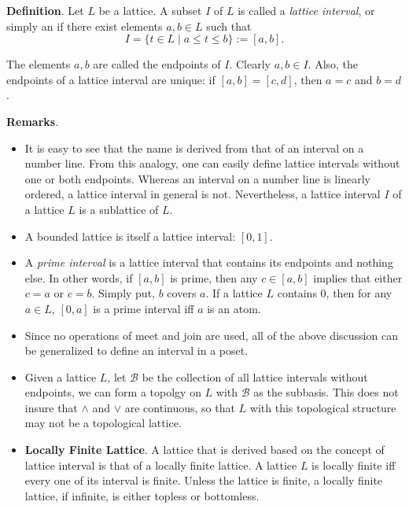 \documentclass[12pt]{article}
\begin{document}
\textbf{Definition}.  Let $L$ be a lattice.  A subset $I$ of $L$ is called a \emph{lattice interval}, or simply an \emph{} if there exist elements $a,b\in L$ such that $$I=\lbrace t\in L\mid a\le t\le b\rbrace:=[a,b].$$

The elements $a,b$ are called the endpoints of $I$.  Clearly $a,b\in I$.  Also, the endpoints of a lattice interval are unique: if $[a,b]=[c,d]$, then $a=c$ and $b=d$.

\textbf{Remarks}.
\begin{itemize}
\item It is easy to see that the name is derived from that of an interval on a number line.  From this analogy, one can easily define lattice intervals without one or both endpoints.  Whereas an interval on a number line is linearly ordered, a lattice interval in general is not.  Nevertheless, a lattice interval $I$ of a lattice $L$ is a sublattice of $L$.
\item A bounded lattice is itself a lattice interval: $[0,1]$.
\item A \emph{prime interval} is a lattice interval that contains its endpoints and nothing else.  In other words, if $[a,b]$ is prime, then any $c\in [a,b]$ implies that either $c=a$ or $c=b$.  Simply put, $b$ covers $a$.  If a lattice $L$ contains $0$, then for any $a\in L$, $[0,a]$ is a prime interval iff $a$ is an atom.
\item Since no operations of meet and join are used, all of the above discussion can be generalized to define an interval in a poset.
\item Given a lattice $L$, let $\mathcal{B}$ be the collection of all lattice intervals without endpoints, we can form a topolgy on $L$ with $\mathcal{B}$ as the subbasis.  This does not insure that $\wedge$ and $\vee$ are continuous, so that $L$ with this topological structure may not be a topological lattice.
\item \textbf{Locally Finite Lattice}.  A lattice that is derived based on the concept of lattice interval is that of a locally finite lattice.  A lattice $L$ is locally finite iff every one of its interval is finite.  Unless the lattice is finite, a locally finite lattice, if infinite, is either topless or bottomless.
\end{itemize}
\end{document}
